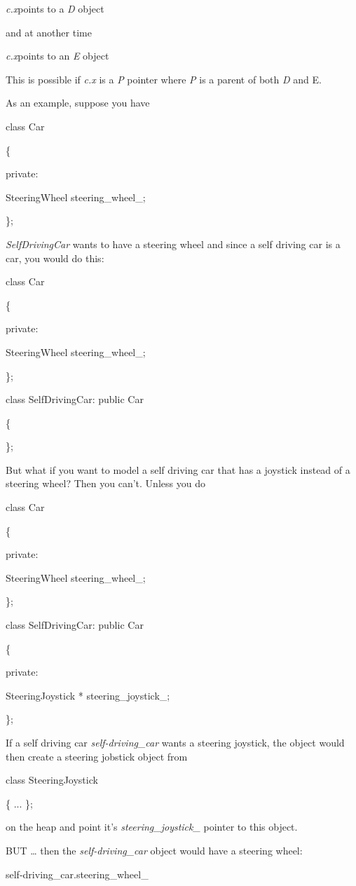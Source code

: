 \documentclass[
]{article}
\begin{document}
\emph{c.x}points to a \emph{D} object

and at another time

\emph{c.x}points to an \emph{E} object

This is possible if \emph{c.x} is a \emph{P} pointer where \emph{P} is a
parent of both \emph{D} and E.

As an example, suppose you have

class Car

\{

private:

SteeringWheel steering\_wheel\_;

\};

\emph{SelfDrivingCar} wants to have a steering wheel and since a self
driving car is a car, you would do this:

class Car

\{

private:

SteeringWheel steering\_wheel\_;

\};

class SelfDrivingCar: public Car

\{

\};

But what if you want to model a self driving car that has a joystick
instead of a steering wheel? Then you can't. Unless you do

class Car

\{

private:

SteeringWheel steering\_wheel\_;

\};

class SelfDrivingCar: public Car

\{

private:

SteeringJoystick * steering\_joystick\_;

\};

If a self driving car \emph{self-driving\_car} wants a steering
joystick, the object would then create a steering jobstick object from

class SteeringJoystick

\{ ... \};

on the heap and point it's \emph{steering\_joystick\_} pointer to this
object.

BUT \ldots{} then the \emph{self-driving\_car} object would have a
steering wheel:

self-driving\_car.steering\_wheel\_
\end{document}
